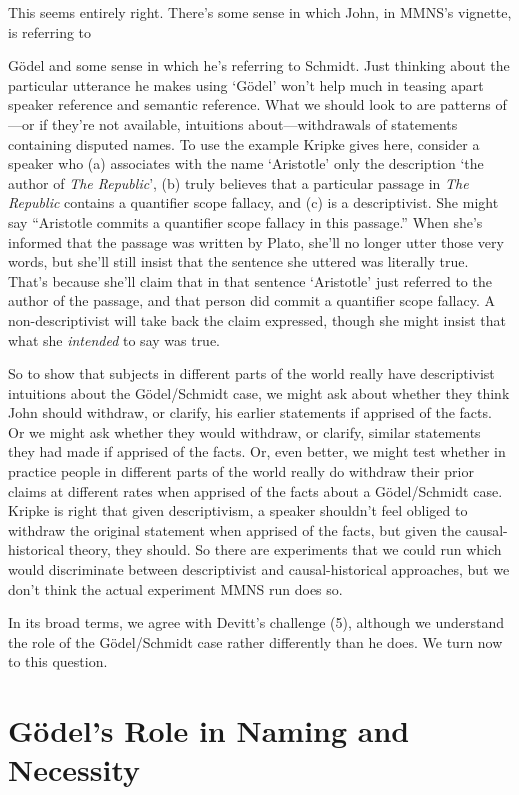 \noindent This seems entirely right. There's some sense in which John, in MMNS's vignette, is referring to {G\"{o}del and some sense in which he's referring to Schmidt. Just thinking about the particular utterance he makes using `G\"{o}del' won't help much in teasing apart speaker reference and semantic reference. What we should look to are patterns of---or if they're not available, intuitions about---withdrawals of statements containing disputed names. To use the example Kripke gives here, consider a speaker who (a) associates with the name `Aristotle' only the description `the author of \textit{The Republic}', (b) truly believes that a particular passage in \textit{The Republic} contains a quantifier scope fallacy, and (c) is a descriptivist. She might say ``Aristotle commits a quantifier scope fallacy in this passage.'' When she's informed that the passage was written by Plato, she'll no longer utter those very words, but she'll still insist that the sentence she uttered was literally true. That's because she'll claim that in that sentence `Aristotle' just referred to the author of the passage, and that person did commit a quantifier scope fallacy. A non-descriptivist will take back the claim expressed, though she might insist that what she \textit{intended} to say was true.

So to show that subjects in different parts of the world really have descriptivist intuitions about the G\"{o}del\-/\-Schmidt case, we might ask about whether they think John should withdraw, or clarify, his earlier statements if apprised of the facts. Or we might ask whether they would withdraw, or clarify, similar statements they had made if apprised of the facts. Or, even better, we might test whether in practice people in different parts of the world really do withdraw their prior claims at different rates when apprised of the facts about a G\"{o}del\-/\-Schmidt case. Kripke is right that given descriptivism, a speaker shouldn't feel obliged to withdraw the original statement when apprised of the facts, but given the causal-historical theory, they should. So there are experiments that we could run which would discriminate between descriptivist and causal-historical approaches, but we don't think the actual experiment MMNS run does so.

In its broad terms, we agree with Devitt's challenge (5), although we understand the role of the G\"{o}del\-/\-Schmidt case rather differently than he does. We turn now to this question.

\section{G\"{o}del's Role in Naming and Necessity}

}
